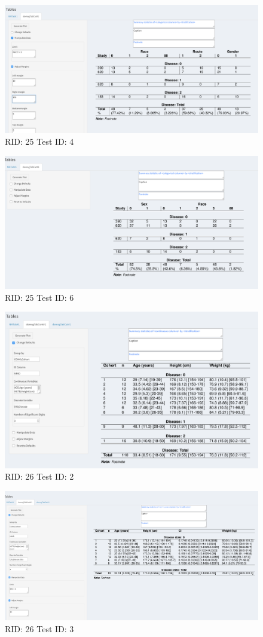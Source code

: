 \documentclass{article}
\begin{document}
\begin{figure}[H]
\includegraphics[width=.8\textwidth]{screencaps/25-4-1.png}
\caption{RID: 25 Test ID: 4}
\end{figure}

\begin{figure}[H]
\includegraphics[width=.8\textwidth]{screencaps/25-6-1.png}
\caption{RID: 25 Test ID: 6}
\end{figure}


\begin{figure}[H]
\includegraphics[width=.8\textwidth]{screencaps/26-2-1.png}
\caption{RID: 26 Test ID: 2}
\end{figure}


\begin{figure}[H]
\includegraphics[width=.8\textwidth]{screencaps/26-3-1.png}
\caption{RID: 26 Test ID: 3}
\end{figure}
\end{document}

